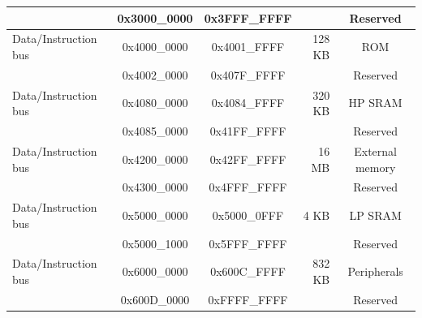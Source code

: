 \begin{ThreePartTable}
\begin{longtable}[c]{|p{3.5cm}|c|c|r|c| }
        \rowcolor{gray!25}  & 0x3000\_0000 & 0x3FFF\_FFFF &        & Reserved      \\\hline
        {Data/Instruction bus} & 0x4000\_0000 & 0x4001\_FFFF & 128 KB  & ROM\tnote{*}  \\\hline

        \hline

        \rowcolor{gray!25}  & 0x4002\_0000 & 0x407F\_FFFF &         & Reserved      \\\hline
        {Data/Instruction bus} & 0x4080\_0000 & 0x4084\_FFFF & 320 KB  & HP SRAM\tnote{*} \\\hline

        \hline

        \rowcolor{gray!25}  & 0x4085\_0000 & 0x41FF\_FFFF &         & Reserved      \\\hline
        {Data/Instruction bus} & 0x4200\_0000 & 0x42FF\_FFFF & 16 MB & External memory \\\hline
        \rowcolor{gray!25}  & 0x4300\_0000 & 0x4FFF\_FFFF &         & Reserved      \\\hline
        {Data/Instruction bus} & 0x5000\_0000 & 0x5000\_0FFF & 4 KB  & LP SRAM\tnote{*} \\\hline 
        \rowcolor{gray!25}  & 0x5000\_1000 & 0x5FFF\_FFFF &         & Reserved      \\\hline
        {Data/Instruction bus} & 0x6000\_0000 & 0x600C\_FFFF & 832 KB  & Peripherals \\\hline
        \rowcolor{gray!25}  & 0x600D\_0000 & 0xFFFF\_FFFF &         & Reserved      \\\hline
\end{longtable}
\end{ThreePartTable}

